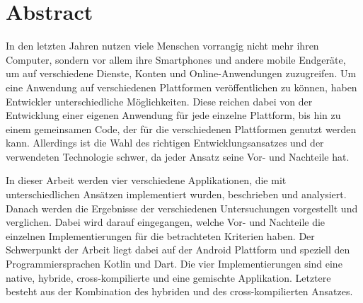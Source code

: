 \chapter*{Abstract}

\bigskip 

In den letzten Jahren nutzen viele Menschen vorrangig nicht mehr ihren Computer, sondern vor allem ihre Smartphones und andere mobile Endgeräte, um auf verschiedene Dienste, Konten und Online-Anwendungen zuzugreifen. Um eine Anwendung auf verschiedenen Plattformen veröffentlichen zu können, haben Entwickler unterschiedliche Möglichkeiten. Diese reichen dabei von der Entwicklung einer eigenen Anwendung für jede einzelne Plattform, bis hin zu einem gemeinsamen Code, der für die verschiedenen Plattformen genutzt werden kann. Allerdings ist die Wahl des richtigen Entwicklungsansatzes und der verwendeten Technologie schwer, da jeder Ansatz seine Vor- und Nachteile hat. 

In dieser Arbeit werden vier verschiedene Applikationen, die mit unterschiedlichen Ansätzen implementiert wurden, beschrieben und analysiert. Danach werden die Ergebnisse der verschiedenen Untersuchungen vorgestellt und verglichen. Dabei wird darauf eingegangen, welche Vor- und Nachteile die einzelnen Implementierungen für die betrachteten Kriterien haben. Der Schwerpunkt der Arbeit liegt dabei auf der Android Plattform und speziell den Programmiersprachen Kotlin und Dart. Die vier Implementierungen sind eine native, hybride, cross-kompilierte und eine gemischte Applikation. Letztere besteht aus der Kombination des hybriden und des cross-kompilierten Ansatzes.